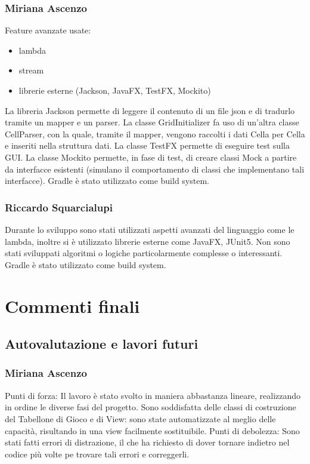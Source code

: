 \documentclass[a4paper,12pt]{report}
\begin{document}
	\subsection{Miriana Ascenzo}

	Feature avanzate usate:
	\begin{itemize}
		\item lambda
		\item stream
		\item librerie esterne (Jackson, JavaFX, TestFX, Mockito)
	\end {itemize}
	La libreria Jackson permette di leggere il contenuto di un file json e di tradurlo tramite un mapper e un parser.
	La classe GridInitializer fa uso di un’altra classe CellParser, con la quale, tramite il mapper, vengono raccolti i dati Cella per Cella e inseriti nella struttura dati.
	La classe TestFX permette di eseguire test sulla GUI.
	La classe Mockito permette, in fase di test, di creare classi Mock a partire da interfacce esistenti (simulano il comportamento di classi che implementano tali interfacce).
    Gradle è stato utilizzato come build system.

	\subsection{Riccardo Squarcialupi}
	
 	Durante lo sviluppo sono stati utilizzati aspetti avanzati del linguaggio come le lambda, inoltre si è utilizzato librerie esterne come JavaFX, JUnit5.
    	Non sono stati sviluppati algoritmi o logiche particolarmente complesse o interessanti.
    	Gradle è stato utilizzato come build system.

	\chapter{Commenti finali}

    \section{Autovalutazione e lavori futuri}

    \subsection{Miriana Ascenzo}
    Punti di forza:
    Il lavoro è stato svolto in maniera abbastanza lineare, realizzando in ordine le diverse fasi del progetto.
    Sono soddisfatta delle classi di costruzione del Tabellone di Gioco e di View:
    sono state automatizzate al meglio delle capacità, risultando in una view facilmente sostituibile.\newline
    Punti di debolezza:
    Sono stati fatti errori di distrazione, il che ha richiesto di dover tornare indietro nel codice più volte pe trovare tali errori e correggerli.
\end{document}
